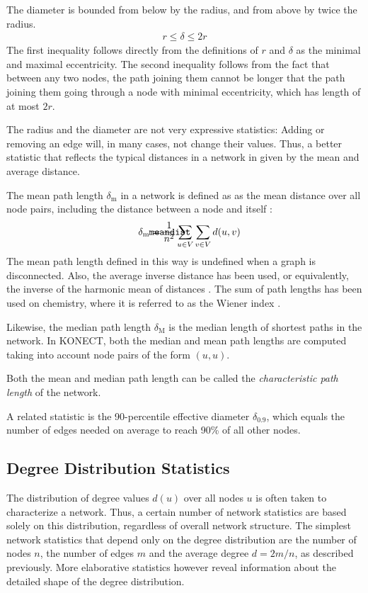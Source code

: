 \documentclass{article}
\def\mathnote#1{%
  \tag*{\rlap{\hspace\marginparsep\smash{\parbox[t]{\marginparwidth}{#1}}}}
}
\begin{document}
The diameter is bounded from below by the radius, and from above by
twice the radius.  
\begin{align}
  r \leq \delta \leq 2r
\end{align}
The first inequality follows directly from the definitions of $r$ and
$\delta$ as the minimal and maximal eccentricity.  The second inequality
follows from the fact that between any two nodes, the path joining them
cannot be longer that the path joining them going through a node with
minimal eccentricity, which has length of at most $2r$. 

The radius and the diameter are not very expressive statistics: Adding
or removing an edge will, in many cases, not change their values.  Thus,
a better statistic that reflects the typical distances in a network in
given by the mean and average distance.

The mean path length $\delta_{\mathrm m}$ in a network is defined as as
the mean distance over all node pairs, including the distance between a
node and itself \citep{b779}:
\begin{align}
  \mathnote{\texttt{meandist}} 
  \delta_{\mathrm m} &= \frac 1 {n^2}
  \sum_{u \in V} \sum_{v\in V} d(u,v)
\end{align}
The mean path length defined in this way is undefined when a graph is
disconnected.  Also, the average inverse distance has been used, or
equivalently, the inverse of the harmonic mean of distances
\citep{b877}.  The sum of path lengths has been used on chemistry, where
it is referred to as the Wiener index \citep{b901}.

Likewise, the median path length $\delta_{\mathrm M}$ is the median
length of shortest paths in the network.  In KONECT, both the median and
mean path lengths are computed taking into account node pairs of the
form $(u,u)$.

Both the mean and median path length can be called the
\emph{characteristic path length} of the network.

A related statistic is the 90-percentile effective diameter
$\delta_{0.9}$, which equals the number of edges needed on average to
reach 90\% of all other nodes.

\subsection{Degree Distribution Statistics}
The distribution of degree values $d(u)$ over all nodes $u$ is often
taken to characterize a network.  Thus, a certain number of network
statistics are based solely on this distribution, regardless of overall
network structure.  
The simplest network statistics that depend only on the degree
distribution are the number of nodes $n$, the number of edges $m$ and
the average degree $d=2m/n$, as described previously.  More elaborative
statistics however reveal information about the detailed shape of the
degree distribution. 
\end{document}
